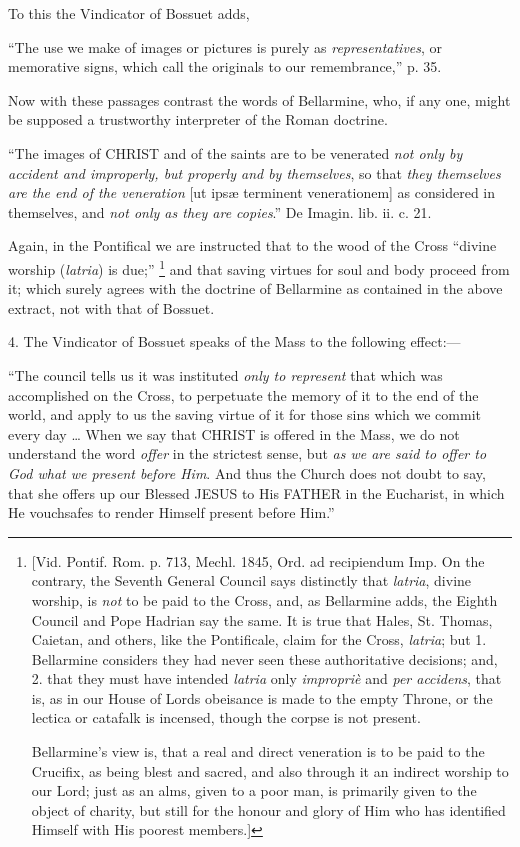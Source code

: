 To this the Vindicator of Bossuet adds,

``The
use we make of images or pictures is purely as \emph{representatives},
or memorative signs, which call the originals to our remembrance,'' p.
35.

Now with these passages contrast the words of
Bellarmine, who, if any one, might be supposed a trustworthy
interpreter of the Roman doctrine.

``The
images of CHRIST
and of the saints are to be venerated \emph{not only by accident and
improperly, but properly and by themselves}, so that \emph{they
themselves are the end of the veneration} [ut ipsæ terminent
venerationem] as considered in themselves, and \emph{not only as they are
copies}.'' De Imagin. lib. ii. c. 21.

Again, in the Pontifical we are instructed that
to the wood of the Cross ``divine worship (\emph{latria}) is due;'' \footnote{[Vid. Pontif. Rom. p. 713, Mechl. 1845, Ord. ad recipiendum Imp. On the
contrary, the Seventh General Council says distinctly that \emph{latria},
divine worship, is \emph{not} to be paid to the Cross, and, as
Bellarmine adds, the Eighth Council and Pope Hadrian say the same. It
is true that Hales, St. Thomas, Caietan, and others, like the
Pontificale, claim for the Cross, \emph{latria}; but 1. Bellarmine
considers they had never seen these authoritative decisions; and, 2.
that they must have intended \emph{latria} only \emph{impropriè} and \emph{per
accidens}, that is, as in our House of Lords obeisance is made to
the empty Throne, or the lectica or catafalk is incensed, though the
corpse is not present.

Bellarmine's view is, that a real and direct
veneration is to be paid to the Crucifix, as being blest and sacred,
and also through it an indirect worship to our Lord; just as an alms,
given to a poor man, is primarily given to the object of charity, but
still for the honour and glory of Him who has identified Himself with
His poorest members.]} and that saving virtues for soul and body proceed from
it; which surely agrees with the doctrine of Bellarmine as contained
in the above extract, not with that of Bossuet.

4. The Vindicator of Bossuet speaks of the Mass
to the following effect:—

``The
council tells us it was instituted \emph{only to represent} that which
was accomplished on the Cross, to perpetuate the memory of it to the
end of the world, and apply to us the saving virtue of it for those
sins which we commit every day … When we say that CHRIST
is offered in the Mass, we do not understand the word \emph{offer} in
the strictest sense, but \emph{as we are said to offer to God what we
present before Him}. And thus the Church does not doubt to say,
that she offers up our Blessed JESUS
to His FATHER in the
Eucharist, in which He vouchsafes to render Himself present before
Him.''

